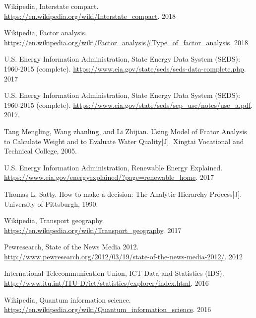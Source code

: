 \documentclass[a4paper,11pt]{article}
\begin{document}
\newpage%
\thispagestyle{empty}%
\begin{thebibliography}{}
%
%
Wikipedia, Interstate compact. \url{https://en.wikipedia.org/wiki/Interstate_compact}. 2018

Wikipedia, Factor analysis. \url{https://en.wikipedia.org/wiki/Factor_analysis#Type_of_factor_analysis}. 2018

U.S. Energy Information Administration, State Energy Data System (SEDS): 1960-2015 (complete). \url{https://www.eia.gov/state/seds/seds-data-complete.php}. 2017

U.S. Energy Information Administration, State Energy Data System (SEDS): 1960-2015 (complete). \url{https://www.eia.gov/state/seds/sep_use/notes/use_a.pdf}. 2017.

Tang Mengling, Wang zhanling, and Li Zhijian. Using Model of Fcator Analysis to Calculate Weight and to Evaluate Water Quality[J]. Xingtai Vocational and Technical College, 2005.

U.S. Energy Information Administration, Renewable Energy Explained. \url{https://www.eia.gov/energyexplained/?page=renewable_home}. 2017


Thomas L. Satty. How to make a decision: The Analytic Hierarchy Process[J]. University of Pittsburgh, 1990.

Wikipedia, Transport geography. \url{https://en.wikipedia.org/wiki/Transport_geography}. 2017


Pewresearch, State of the News Media 2012. \url{http://www.pewresearch.org/2012/03/19/state-of-the-news-media-2012/}. 2012

International Telecommunication Union, ICT Data and Statistics (IDS). \url{http://www.itu.int/ITU-D/ict/statistics/explorer/index.html}. 2016

Wikipedia, Quantum information science. \url{https://en.wikipedia.org/wiki/Quantum_information_science}. 2016
\end{thebibliography}
\end{document}
